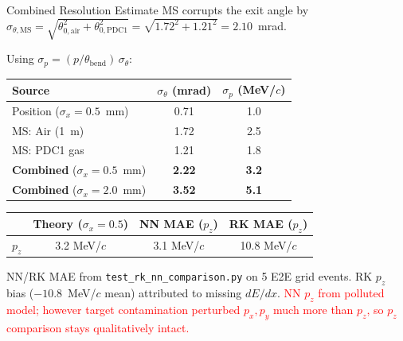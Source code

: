 \documentclass[aspectratio=169]{beamer}
\begin{document}
\begin{frame}{Combined Resolution Estimate}
\small
MS corrupts the exit angle by $\sigma_{\theta,\mathrm{MS}} = \sqrt{\theta_{0,\mathrm{air}}^2 + \theta_{0,\mathrm{PDC1}}^2} = \sqrt{1.72^2 + 1.21^2} = 2.10$~mrad.

Using $\sigma_p = (p / \theta_\mathrm{bend})\,\sigma_\theta$:

\begin{table}
\centering
\begin{tabular}{lcc}
\toprule
Source & $\sigma_\theta$ (mrad) & $\sigma_p$ (MeV/$c$) \\
\midrule
Position ($\sigma_x{=}0.5$~mm) & 0.71 & 1.0 \\
MS: Air (1~m) & 1.72 & 2.5 \\
MS: PDC1 gas & 1.21 & 1.8 \\
\midrule
\textbf{Combined} ($\sigma_x{=}0.5$~mm) & \textbf{2.22} & \textbf{3.2} \\
\textbf{Combined} ($\sigma_x{=}2.0$~mm) & \textbf{3.52} & \textbf{5.1} \\
\bottomrule
\end{tabular}
\end{table}

\begin{table}
\centering
\begin{tabular}{lccc}
\toprule
 & Theory ($\sigma_x{=}0.5$) & NN MAE ($p_z$) & RK MAE ($p_z$) \\
\midrule
$p_z$ & 3.2 MeV/$c$ & 3.1 MeV/$c$ & 10.8 MeV/$c$ \\
\bottomrule
\end{tabular}
\end{table}

{\footnotesize NN/RK MAE from \texttt{test\_rk\_nn\_comparison.py} on 5 E2E grid events. RK $p_z$ bias ($-10.8$~MeV/$c$ mean) attributed to missing $dE/dx$. \textcolor{red}{NN $p_z$ from polluted model; however target contamination perturbed $p_x,p_y$ much more than $p_z$, so $p_z$ comparison stays qualitatively intact.}}
\end{frame}
\end{document}
